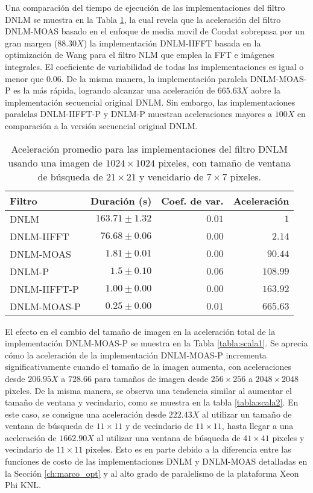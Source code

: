 Una comparaci\'on del tiempo de ejecuci\'on de las implementaciones del filtro DNLM se muestra en la Tabla \ref{tabla:speedup}, la cual revela que la aceleraci\'on del filtro DNLM-MOAS basado en el enfoque de media movil de Condat \cite{Condat2010} sobrepasa por un gran margen ($88.30X$) la implementaci\'on DNLM-IIFFT \cite{CalderonRamirez2017} basada en la optimizaci\'on de Wang para el filtro NLM \cite{wang2006fast} que emplea la FFT e im\'agenes integrales. El coeficiente de variabilidad de todas las implementaciones es igual o menor que $0.06$. 
De la misma manera, la implementaci\'on paralela DNLM-MOAS-P es la m\'as r\'apida, logrando alcanzar una aceleraci\'on de $665.63X$ aobre la implementaci\'on secuencial original DNLM. Sin embargo, las implementaciones paralelas DNLM-IIFFT-P y DNLM-P muestran aceleraciones mayores a $100X$ en comparaci\'on a la versi\'on secuencial original DNLM.



\begin{table}[H]
\protect\caption{Aceleraci\'on promedio para las implementaciones del filtro DNLM usando una imagen de  $1024 \times 1024$ pixeles, con tama\~no de ventana de b\'usqueda de $21 \times 21$ y vencidario de $7 \times 7$ pixeles. \label{tabla:speedup}}
\centering
\begin{tabular}{lrrr}
Filtro & Duraci\'on (s)& Coef. de var. & Aceleraci\'on \tabularnewline
\hline
DNLM & $163.71\pm1.32$ & $0.01$ & $1$\tabularnewline
DNLM-IIFFT & $76.68\pm0.06$ & $0.00$ & $2.14$\tabularnewline
DNLM-MOAS & $1.81\pm 0.01$ & $0.00$ & $90.44$ \tabularnewline
DNLM-P & $1.5\pm0.10$ & $0.06$ & $108.99$\tabularnewline
DNLM-IIFFT-P & $1.00\pm0.00$ & $0.00$ & $163.92$ \tabularnewline 
DNLM-MOAS-P & $\boldsymbol{0.25\pm0.00}$ & $\boldsymbol{0.01}$ &  $\boldsymbol{665.63}$\tabularnewline
\end{tabular}
\end{table}


El efecto en el cambio del tama\~no de imagen en la aceleraci\'on total de la implementaci\'on DNLM-MOAS-P se muestra en la Tabla \ref{tabla:scala1}. Se aprecia c\'omo la aceleraci\'on de la implementaci\'on DNLM-MOAS-P incrementa significativamente cuando el tama\~no de la imagen aumenta, con aceleraciones desde $206.95X$ a $728.66$ para tama\~nos de imagen desde $256 \times 256$ a $2048 \times 2048$ pixeles. 
De la misma manera, se observa una tendencia similar al aumentar el tama\~no de ventana y vecindario, como se muestra en la tabla \ref{tabla:scala2}. En este caso, se consigue una aceleraci\'on desde $222.43X$ al utilizar un tama\~no de ventana de b\'usqueda de $11 \times 11$ y de vecindario de $11 \times 11$, hasta llegar a una aceleraci\'on de $1662.90X$ al utilizar una ventana de b\'usqueda de $41 \times 41$ pixeles y vecindario de $11 \times 11$ pixeles. Esto es en parte debido a la diferencia entre las funciones de costo de las implementaciones DNLM y DNLM-MOAS detalladas en la Secci\'on \ref{ch:marco_opt} y al alto grado de paralelismo de la plataforma Xeon Phi KNL.


